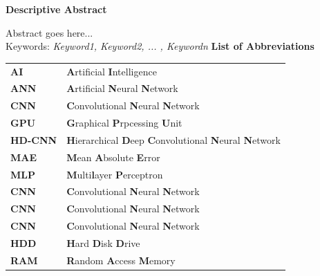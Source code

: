 \documentclass[12pt]{extarticle}
\begin{document}
	\tableofcontents
	\listoffigures
	\newpage
	\begin{center}
		\LARGE{\textbf{Descriptive Abstract}}\\ \vspace{1cm}
	\end{center}
	Abstract goes here...\\
	Keywords: \emph{Keyword1, Keyword2, ... , Keywordn}
	\newpage
	\LARGE{\textbf{List of Abbreviations}}\\ \vspace{1cm}
	\begin{center}
		\begin{tabular}{l l}
			\multicolumn{1}{p{3cm}}{\large{\textbf{AI}}} &  \multicolumn{1}{p{8cm}}{\large{\textbf{A}rtificial \textbf{I}ntelligence}} \\
			\multicolumn{1}{p{3cm}}{\large{\textbf{ANN}}} &  \multicolumn{1}{p{8cm}}{\large{\textbf{A}rtificial \textbf{N}eural \textbf{N}etwork}} \\
			\multicolumn{1}{p{3cm}}{\large{\textbf{CNN}}} &  \multicolumn{1}{p{8cm}}{\large{\textbf{C}onvolutional \textbf{N}eural \textbf{N}etwork}}\\ 
			\multicolumn{1}{p{3cm}}{\large{\textbf{GPU}}} &  \multicolumn{1}{p{8cm}}{\large{\textbf{G}raphical \textbf{P}rpcessing \textbf{U}nit}}\\ 
			\multicolumn{1}{p{3cm}}{\large{\textbf{HD-CNN}}} &  \multicolumn{1}{p{8cm}}{\large{\textbf{H}ierarchical \textbf{D}eep \textbf{C}onvolutional \textbf{N}eural \textbf{N}etwork}}\\ 
			\multicolumn{1}{p{3cm}}{\large{\textbf{MAE}}} &  \multicolumn{1}{p{8cm}}{\large{\textbf{M}ean \textbf{A}bsolute \textbf{E}rror}}\\  
			\multicolumn{1}{p{3cm}}{\large{\textbf{MLP}}} &  \multicolumn{1}{p{8cm}}{\large{\textbf{M}ulti\textbf{l}ayer \textbf{P}erceptron}}\\ 
			\multicolumn{1}{p{3cm}}{\large{\textbf{CNN}}} &  \multicolumn{1}{p{8cm}}{\large{\textbf{C}onvolutional \textbf{N}eural \textbf{N}etwork}}\\ 
			\multicolumn{1}{p{3cm}}{\large{\textbf{CNN}}} &  \multicolumn{1}{p{8cm}}{\large{\textbf{C}onvolutional \textbf{N}eural \textbf{N}etwork}}\\ 
			\multicolumn{1}{p{3cm}}{\large{\textbf{CNN}}} &  \multicolumn{1}{p{8cm}}{\large{\textbf{C}onvolutional \textbf{N}eural \textbf{N}etwork}}\\
			\multicolumn{1}{p{3cm}}{\large{\textbf{HDD}}} &  \multicolumn{1}{p{8cm}}{\large{\textbf{H}ard \textbf{D}isk \textbf{D}rive}}\\ 
			\multicolumn{1}{p{3cm}}{\large{\textbf{RAM}}} &  \multicolumn{1}{p{8cm}}{\large{\textbf{R}andom \textbf{A}ccess \textbf{M}emory}}
			 
		\end{tabular}
	\end{center}
\end{document}
